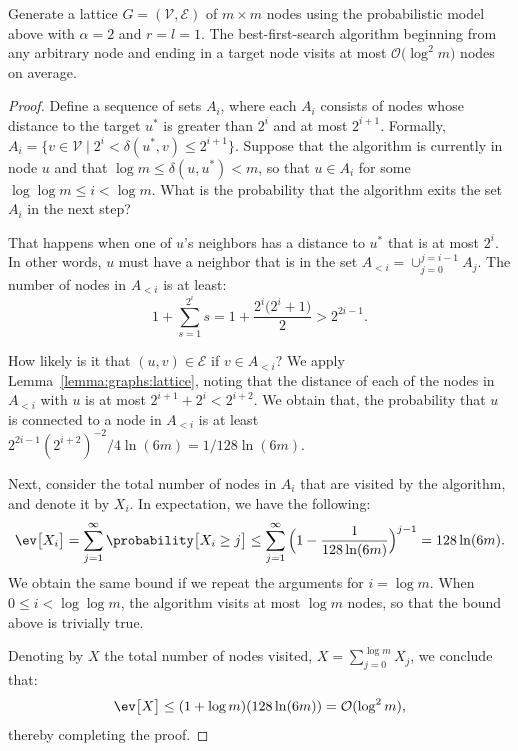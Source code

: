 \begin{theorem}
    \label{theorem:graphs:lattice}
    Generate a lattice $G = (\mathcal{V}, \mathcal{E})$ of $m \times m$
    nodes using the probabilistic model above
    with $\alpha = 2$ and $r = l = 1$.
    The best-first-search algorithm beginning from any arbitrary node
    and ending in a target node visits at most $\mathcal{O}\big( \log^2 m \big)$ nodes on average.
\end{theorem}
\begin{proof}
    Define a sequence of sets $A_i$, where each $A_i$ consists of nodes whose distance
    to the target $u^\ast$ is greater than $2^i$ and at most $2^{i + 1}$.
    Formally, $A_i = \{ v \in \mathcal{V} \;|\; 2^i < \delta(u^\ast, v) \leq 2^{i + 1} \}$.
    Suppose that the algorithm is currently in node $u$
    and that $\log m \leq \delta(u, u^\ast) < m$, so that $u \in A_i$
    for some $\log \log m \leq i < \log m$. What is the probability that the algorithm
    exits the set $A_i$ in the next step?
    
    That happens when one of $u$'s neighbors has a distance to $u^\ast$ that is
    at most $2^i$. In other words, $u$ must have a neighbor that is in the set
    $A_{<i} = \cup_{j=0}^{j=i-1} A_j$.
    The number of nodes in $A_{<i}$ is at least:
    \begin{equation*}
        1 + \sum_{s=1}^{2^i} s = 1 + \frac{2^i \big( 2^i + 1\big)}{2} > 2^{2i - 1}.
    \end{equation*}

    How likely is it that $(u, v) \in \mathcal{E}$ if $v \in A_{<i}$?
    We apply Lemma~\ref{lemma:graphs:lattice}, noting that the distance of each of the
    nodes in $A_{<i}$ with $u$ is at most $2^{i + 1} + 2^i < 2^{i + 2}$.
    We obtain that, the probability that $u$ is connected to a node in $A_{<i}$ is at least
    $2^{2i - 1} (2^{i + 2})^{-2} / 4 \ln(6m) = 1 / 128 \ln (6m)$.

    Next, consider the total number of nodes in $A_i$ that are visited by the algorithm,
    and denote it by $X_i$. In expectation, we have the following:
    \begin{equation*}
        \ev \big[ X_i \big] = \sum_{j = 1}^\infty \probability \big[ X_i \geq j \big] \leq
        \sum_{j = 1}^\infty \Big( 1 - \frac{1}{128 \ln (6m)} \Big)^{j - 1} =
        128 \ln (6m).
    \end{equation*}
    We obtain the same bound if we repeat the arguments for $i = \log m$.
    When $0 \leq i < \log \log m$, the algorithm visits at most $\log m$
    nodes, so that the bound above is trivially true.

    Denoting by $X$ the total number of nodes visited, $X = \sum_{j = 0}^{\log m} X_j$,
    we conclude that:
    \begin{equation*}
        \ev \big[ X \big] \leq (1 + \log m)(128 \ln(6m)) = \mathcal{O}(\log^2 m),
    \end{equation*}
    thereby completing the proof.
\end{proof}

